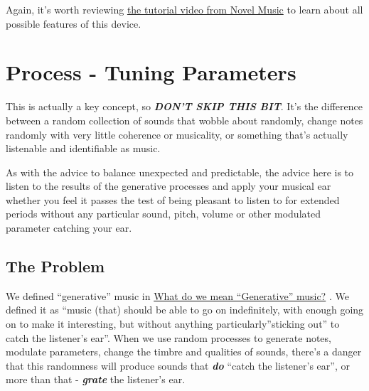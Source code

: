 \documentclass[
  12pt,
  letterpaper,
  oneside,
  open=any]{scrbook}
\makeatletter
\newcommand*\pandocbounded[1]{%
  \sbox\pandoc@box{#1}%
  \Gscale@div\@tempa{\textheight}{\dimexpr\ht\pandoc@box+\dp\pandoc@box\relax}%
  \Gscale@div\@tempb{\linewidth}{\wd\pandoc@box}%
  \ifdim\@tempb\p@<\@tempa\p@\let\@tempa\@tempb\fi%
  \ifdim\@tempa\p@<\p@\scalebox{\@tempa}{\usebox\pandoc@box}%
  \else\usebox{\pandoc@box}%
  \fi%
}
\makeatother
\begin{document}
Again, it's worth reviewing
\href{https://www.youtube.com/watch?v=4WwKGUV2H4I}{the tutorial video
from Novel Music} to learn about all possible features of this device.

\pandocbounded{\texttt{[image: images/Deviate\_map.png]}}


\chapter{Process - Tuning
Parameters}\label{008-Process-Tuning_Parameters}

This is actually a key concept, so \textbf{\emph{DON'T SKIP THIS BIT}}.
It's the difference between a random collection of sounds that wobble
about randomly, change notes randomly with very little coherence or
musicality, or something that's actually listenable and identifiable as
music.

\begin{tcolorbox}[enhanced jigsaw, toprule=.15mm, leftrule=.75mm, coltitle=black, bottomtitle=1mm, colbacktitle=quarto-callout-tip-color!10!white, bottomrule=.15mm, opacityback=0, colback=white, arc=.35mm, colframe=quarto-callout-tip-color-frame, opacitybacktitle=0.6, toptitle=1mm, titlerule=0mm, rightrule=.15mm, title=\textcolor{quarto-callout-tip-color}{\faLightbulb}\hspace{0.5em}{Key idea}, left=2mm, breakable]

As with the advice to balance unexpected and predictable, the advice
here is to listen to the results of the generative processes and apply
your musical ear whether you feel it passes the test of being pleasant
to listen to for extended periods without any particular sound, pitch,
volume or other modulated parameter catching your ear.

\end{tcolorbox}

\section{The Problem}\label{the-problem}

We defined ``generative'' music in
\hyperref[0000-Defintion-Generative]{What do we mean ``Generative''
music?} . We defined it as ``music (that) should be able to go on
indefinitely, with enough going on to make it interesting, but without
anything particularly''sticking out'' to catch the listener's ear''.
When we use random processes to generate notes, modulate parameters,
change the timbre and qualities of sounds, there's a danger that this
randomness will produce sounds that \textbf{\emph{do}} ``catch the
listener's ear'', or more than that - \textbf{\emph{grate}} the
listener's ear.
\end{document}
